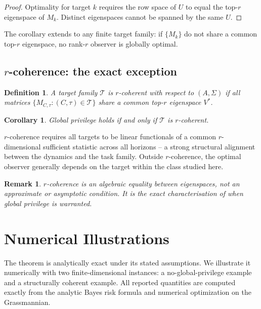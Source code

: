 \documentclass[11pt]{article}
\newtheorem{corollary}[theorem]{Corollary}
\newtheorem{definition}[theorem]{Definition}
\newtheorem{remark}[theorem]{Remark}
\begin{document}
\begin{proof}
Optimality for target $k$ requires the row space of $U$ to equal the top-$r$
eigenspace of $M_k$.
Distinct eigenspaces cannot be spanned by the same $U$.
\end{proof}

The corollary extends to any finite target family: if $\{M_k\}$ do not share
a common top-$r$ eigenspace, no rank-$r$ observer is globally optimal.

\subsection{$r$-coherence: the exact exception}

\begin{definition}\label{def:rcoh}
A target family $\mathcal{T}$ is \emph{$r$-coherent} with respect to
$(A,\Sigma)$ if all matrices $\{M_{C,\tau}:(C,\tau)\in\mathcal{T}\}$
share a common top-$r$ eigenspace $V^*$.
\end{definition}

\begin{corollary}\label{cor:coherence}
Global privilege holds if and only if $\mathcal{T}$ is $r$-coherent.
\end{corollary}

$r$-coherence requires all targets to be linear functionals of a common
$r$-dimensional sufficient statistic across all horizons -- a strong structural
alignment between the dynamics and the task family.
Outside $r$-coherence, the optimal observer generally depends on the target
within the class studied here.

\begin{remark}
$r$-coherence is an algebraic equality between eigenspaces, not an
approximate or asymptotic condition.
It is the exact characterisation of when global privilege is warranted.
\end{remark}

\section{Numerical Illustrations}

The theorem is analytically exact under its stated assumptions.
We illustrate it numerically with two finite-dimensional instances:
a no-global-privilege example and a structurally coherent example.
All reported quantities are computed exactly from the analytic Bayes risk
formula and numerical optimization on the Grassmannian.
\end{document}
